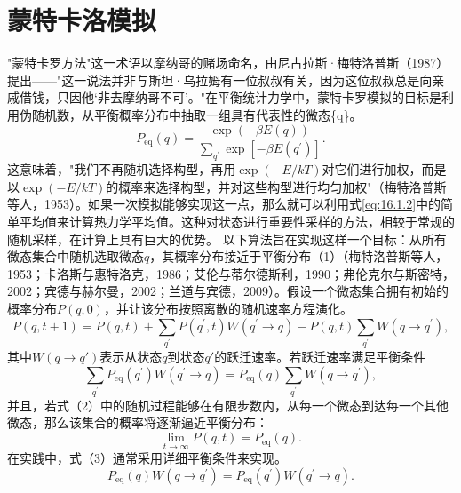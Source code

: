 \section{蒙特卡洛模拟}\label{ux8499ux7279ux5361ux6d1bux6a21ux62df}
"蒙特卡罗方法"这一术语以摩纳哥的赌场命名，由尼古拉斯·梅特洛普斯（1987）提出——"这一说法并非与斯坦·乌拉姆有一位叔叔有关，因为这位叔叔总是向亲戚借钱，只因他`非去摩纳哥不可'。"在平衡统计力学中，蒙特卡罗模拟的目标是利用伪随机数，从平衡概率分布中抽取一组具有代表性的微态\{q\}。
\begin{equation}\tag{16.2.1}\label{eq:16.2.1}
P _ { \mathrm { e q } } ( q ) = \frac { \exp ( - \beta E ( q ) ) } { \sum _ { q ^{\prime} } \exp [ - \beta E ( q ^{\prime} ) ] } .
\end{equation}
这意味着，"我们不再随机选择构型，再用\(\exp(-E/kT)\)对它们进行加权，而是以\(\exp(-E/kT)\)的概率来选择构型，并对这些构型进行均匀加权"（梅特洛普斯等人，1953）。如果一次模拟能够实现这一点，那么就可以利用式\autoref{eq:16.1.2}中的简单平均值来计算热力学平均值。这种对状态进行重要性采样的方法，相较于常规的随机采样，在计算上具有巨大的优势。
以下算法旨在实现这样一个目标：从所有微态集合中随机选取微态\(q\)，其概率分布接近于平衡分布（1）（梅特洛普斯等人，1953；卡洛斯与惠特洛克，1986；艾伦与蒂尔德斯利，1990；弗伦克尔与斯密特，2002；宾德与赫尔曼，2002；兰道与宾德，2009）。假设一个微态集合拥有初始的概率分布\(P(q,0)\)，并让该分布按照离散的随机速率方程演化。
\begin{equation}\tag{16.2.2}\label{eq:16.2.2}
P ( q , t + 1 ) = P ( q , t ) + \sum _ { q ^{\prime} } P ( q ^{\prime} , t ) W ( q ^{\prime} \rightarrow q ) - P ( q , t ) \sum _ { q ^{\prime} } W ( q \rightarrow q ^{\prime} ) ,
\end{equation}
其中\(W(q \rightarrow q')\)表示从状态\(q\)到状态\(q'\)的跃迁速率。若跃迁速率满足平衡条件
\begin{equation}\tag{16.2.3}\label{eq:16.2.3}
\sum _ { q ^{\prime} } P _ { \mathrm { e q } } ( q ^{\prime} ) W ( q ^{\prime} \rightarrow q ) = P _ { \mathrm { e q } } ( q ) \sum _ { q ^{\prime} } W ( q \rightarrow q ^{\prime} ) ,
\end{equation}
并且，若式（2）中的随机过程能够在有限步数内，从每一个微态到达每一个其他微态，那么该集合的概率将逐渐逼近平衡分布：
\begin{equation}\tag{16.2.4}\label{eq:16.2.4}
\operatorname* { l i m } _ { t \to \infty } P ( q , t ) = P _ { \mathrm { e q } } ( q ) .
\end{equation}
在实践中，式（3）通常采用详细平衡条件来实现。
\begin{equation}\tag{16.2.5}\label{eq:16.2.5}
P _ { \mathrm { e q } } ( q ) W ( q \rightarrow q ^{\prime} ) = P _ { \mathrm { e q } } ( q ^{\prime} ) W ( q ^{\prime} \rightarrow q ) .
\end{equation}
